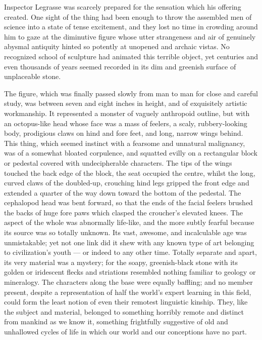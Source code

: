 \begin{pages}
\begin{Leftside}
Inspector Legrasse was scarcely prepared for the sensation which his
offering created. One sight of the thing had been enough to throw the
assembled men of science into a state of tense excitement, and they lost
no time in crowding around him to gaze at the diminutive figure whose
utter strangeness and air of genuinely abysmal antiquity hinted so
potently at unopened and archaic vistas. No recognized school of
sculpture had animated this terrible object, yet centuries and even
thousands of years seemed recorded in its dim and greenish surface of
unplaceable stone.

The figure, which was finally passed slowly from man to man for close
and careful study, was between seven and eight inches in height, and of
exquisitely artistic workmanship. It represented a monster of vaguely
anthropoid outline, but with an octopus-like head whose face was a mass
of feelers, a scaly, rubbery-looking body, prodigious claws on hind and
fore feet, and long, narrow wings behind. This thing, which seemed
instinct with a fearsome and unnatural malignancy, was of a somewhat
bloated corpulence, and squatted evilly on a rectangular block or
pedestal covered with undecipherable characters. The tips of the wings
touched the back edge of the block, the seat occupied the centre, whilst
the long, curved claws of the doubled-up, crouching hind legs gripped
the front edge and extended a quarter of the way down toward the bottom
of the pedestal. The cephalopod head was bent forward, so that the ends
of the facial feelers brushed the backs of huge fore paws which clasped
the croucher's elevated knees. The aspect of the whole was abnormally
life-like, and the more subtly fearful because its source was so totally
unknown. Its vast, awesome, and incalculable age was unmistakable; yet
not one link did it shew with any known type of art belonging to
civilization's youth --- or indeed to any other time. Totally separate and
apart, its very material was a mystery; for the soapy, greenish-black
stone with its golden or iridescent flecks and striations resembled
nothing familiar to geology or mineralogy. The characters along the base
were equally baffling; and no member present, despite a representation
of half the world's expert learning in this field, could form the least
notion of even their remotest linguistic kinship. They, like the subject
and material, belonged to something horribly remote and distinct from
mankind as we know it, something frightfully suggestive of old and
unhallowed cycles of life in which our world and our conceptions have no
part.


\end{Leftside}
\end{pages}
